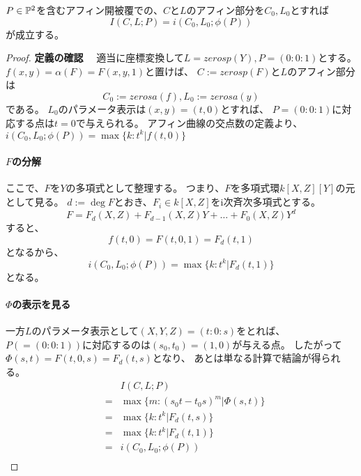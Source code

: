 \documentclass[a4paper]{jsarticle}
\begin{document}
    \begin{Prop}
        $P \in \mathbb{P}^2$を含むアフィン開被覆での、$C$と$L$のアフィン部分を$C_0, L_0$とすれば
        \[ I(C, L; P)=i(C_0, L_0; \phi(P)) \]
        が成立する。
    \end{Prop}
    \begin{proof}
        \textbf{定義の確認}~~
        適当に座標変換して$L=zerosp(Y), P=(0:0:1)$とする。
        $f(x, y)=\alpha(F)=F(x, y, 1)$と置けば、
        $C:=zerosp(F)$と$L$のアフィン部分は
        \[ C_0:=zerosa(f), L_0:=zerosa(y) \]
        である。
        $L_0$のパラメータ表示は$(x, y)=(t, 0)$とすれば、
        $P=(0:0:1)$に対応する点は$t=0$で与えられる。
        アフィン曲線の交点数の定義より、
        $i(C_0, L_0; \phi(P))=\max \{ k : t^k|f(t,0) \}$
        
        \paragraph{$F$の分解}
        ここで、$F$を$Y$の多項式として整理する。
        つまり、$F$を多項式環$k[X, Z][Y]$の元として見る。
        $d:=\deg F$とおき、$F_i \in k[X, Z]$をi次斉次多項式とする。
        \[ F=F_d(X, Z)+F_{d-1}(X, Z)Y + \dots + F_0(X, Z) Y^d \]
        すると、
        \[ f(t, 0)=F(t, 0, 1)=F_d(t, 1) \]
        となるから、
        \[ i(C_0, L_0; \phi(P))=\max \{ k : t^k|F_d(t,1) \} \]
        となる。

        \paragraph{$\Phi$の表示を見る}
        一方$L$のパラメータ表示として$(X, Y, Z)=(t:0:s)$をとれば、
        $P(=(0:0:1))$に対応するのは$(s_0,t_0)=(1,0)$が与える点。
        したがって$\Phi(s, t)=F(t, 0, s)=F_d(t, s)$となり、
        あとは単なる計算で結論が得られる。
        \begin{eqnarray*}
            &{}&    I(C, L; P) \\
            &=&     \max \{ m : (s_0 t-t_0 s)^m | \Phi(s,t) \} \\
            &=&     \max \{ k : t^k|F_d(t,s) \} \\
            &=&     \max \{ k : t^k|F_d(t,1) \} \\
            &=&     i(C_0, L_0; \phi(P)) \\
        \end{eqnarray*}
        
    \end{proof}
\end{document}
